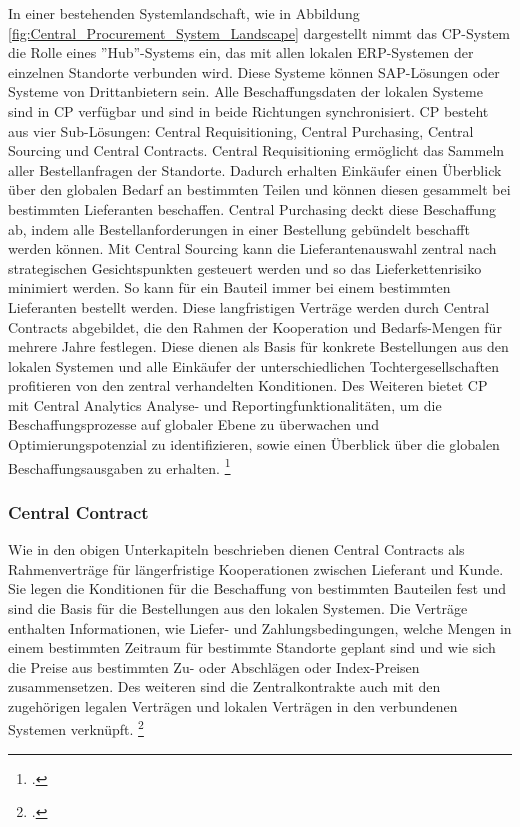 In einer bestehenden Systemlandschaft, wie in Abbildung \ref{fig:Central_Procurement_System_Landscape} dargestellt nimmt das CP-System die Rolle eines ''Hub''-Systems ein, das mit allen lokalen ERP-Systemen der einzelnen Standorte verbunden wird. Diese Systeme können SAP-Lösungen oder Systeme von Drittanbietern sein. Alle Beschaffungsdaten der lokalen Systeme sind in CP verfügbar und sind in beide Richtungen synchronisiert. CP besteht aus vier Sub-Lösungen: Central Requisitioning, Central Purchasing, Central Sourcing und Central Contracts. Central Requisitioning ermöglicht  das Sammeln aller Bestellanfragen der Standorte. Dadurch erhalten Einkäufer einen Überblick über den globalen Bedarf an bestimmten Teilen und können diesen gesammelt bei bestimmten Lieferanten beschaffen. Central Purchasing deckt diese Beschaffung ab, indem alle Bestellanforderungen in einer Bestellung gebündelt beschafft werden können. Mit Central Sourcing kann die Lieferantenauswahl zentral nach strategischen Gesichtspunkten gesteuert werden und so das Lieferkettenrisiko minimiert werden. So kann \zB für ein Bauteil immer bei einem bestimmten Lieferanten bestellt werden. Diese langfristigen Verträge werden durch Central Contracts abgebildet, die den Rahmen der Kooperation und Bedarfs-Mengen für mehrere Jahre festlegen. Diese dienen als Basis für konkrete Bestellungen aus den lokalen Systemen und alle Einkäufer der unterschiedlichen Tochtergesellschaften profitieren von den zentral verhandelten Konditionen. Des Weiteren bietet CP mit Central Analytics Analyse- und Reportingfunktionalitäten, um die Beschaffungsprozesse auf globaler Ebene zu überwachen und Optimierungspotenzial zu identifizieren, sowie einen Überblick über die globalen Beschaffungsausgaben zu erhalten. \footcite[Vgl.][]{theorie_sap_central_procurement_overview_2024}

\subsubsection{Central Contract}

Wie in den obigen Unterkapiteln beschrieben dienen Central Contracts als Rahmenverträge für längerfristige Kooperationen zwischen Lieferant und Kunde. Sie legen die Konditionen für die Beschaffung von bestimmten Bauteilen fest und sind die Basis für die Bestellungen aus den lokalen Systemen. Die Verträge enthalten Informationen, wie \zB Liefer- und Zahlungsbedingungen, welche Mengen in einem bestimmten Zeitraum für bestimmte Standorte geplant sind und wie sich die Preise aus bestimmten Zu- oder Abschlägen oder Index-Preisen zusammensetzen. Des weiteren sind die Zentralkontrakte auch mit den zugehörigen legalen Verträgen und lokalen Verträgen in den verbundenen Systemen verknüpft. \footcite[Vgl.][]{theorie_sap_central_contract_overview_2024}


